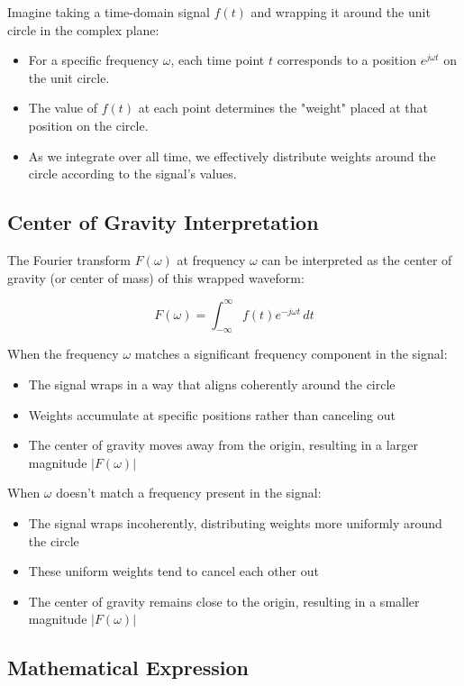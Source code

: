 \documentclass{article}
\begin{document}
Imagine taking a time-domain signal $f(t)$ and wrapping it around the unit circle in the complex plane:

\begin{itemize}
    \item For a specific frequency $\omega$, each time point $t$ corresponds to a position $e^{j\omega t}$ on the unit circle.
    \item The value of $f(t)$ at each point determines the "weight" placed at that position on the circle.
    \item As we integrate over all time, we effectively distribute weights around the circle according to the signal's values.
\end{itemize}

\subsection{Center of Gravity Interpretation}

The Fourier transform $F(\omega)$ at frequency $\omega$ can be interpreted as the center of gravity (or center of mass) of this wrapped waveform:

\[
    F(\omega) = \int_{-\infty}^{\infty} f(t) e^{-j\omega t} \, dt
\]

When the frequency $\omega$ matches a significant frequency component in the signal:
\begin{itemize}
    \item The signal wraps in a way that aligns coherently around the circle
    \item Weights accumulate at specific positions rather than canceling out
    \item The center of gravity moves away from the origin, resulting in a larger magnitude $|F(\omega)|$
\end{itemize}

When $\omega$ doesn't match a frequency present in the signal:
\begin{itemize}
    \item The signal wraps incoherently, distributing weights more uniformly around the circle
    \item These uniform weights tend to cancel each other out
    \item The center of gravity remains close to the origin, resulting in a smaller magnitude $|F(\omega)|$
\end{itemize}

\subsection{Mathematical Expression}
\end{document}
